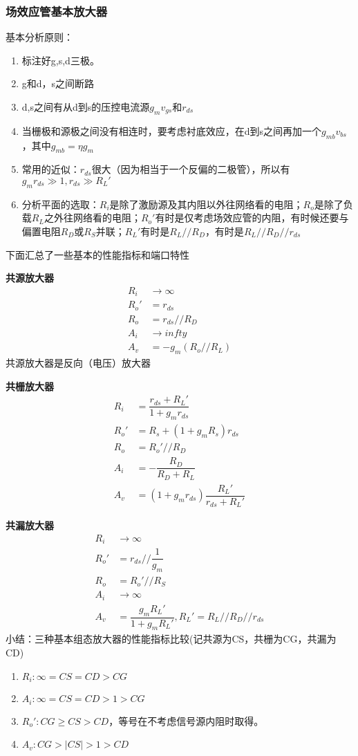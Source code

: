 \documentclass{ctexart}
\newcommand*{\noindbfline}[1]{{\noindent \bf{#1} \newline}}
\begin{document}
\subsubsection{场效应管基本放大器}
基本分析原则：
\begin{enumerate}
    \item 标注好g,s,d三极。
    \item g和d，s之间断路
    \item d,s之间有从d到s的压控电流源$g_mv_{gs}$和$r_{ds}$
    \item 当栅极和源极之间没有相连时，要考虑衬底效应，在d到s之间再加一个$g_{mb}v_{bs}$，其中$g_{mb}=\eta g_m$
    \item 常用的近似：$r_{ds}$很大（因为相当于一个反偏的二极管），所以有$g_mr_{ds} \gg 1,r_{ds}\gg R_L'$
    \item 分析平面的选取：$R_i$是除了激励源及其内阻以外往网络看的电阻；$R_o$是除了负载$R_L$之外往网络看的电阻；$R_o'$有时是仅考虑场效应管的内阻，有时候还要与偏置电阻$R_D$或$R_S$并联；$R_L'$有时是$R_L//R_D$，有时是$R_L//R_D//r_{ds}$
\end{enumerate}
下面汇总了一些基本的性能指标和端口特性

\noindbfline{共源放大器}
\begin{align}
    R_i&\rightarrow \infty\\
    R_o'&=r_{ds}\\
    R_o&=r_{ds}//R_D\\
    A_i&\rightarrow infty\\
    A_v&=-g_m(R_o//R_L)
\end{align}
共源放大器是反向（电压）放大器

\noindbfline{共栅放大器}
\begin{align}
    R_i&=\dfrac{r_{ds}+R_L'}{1+g_mr_{ds}}\\
    R_o'&=R_s+(1+g_mR_s)r_{ds}\\
    R_o&=R_o'//R_D\\
    A_i&=-\dfrac{R_D}{R_D+R_L}\\
    A_v&=(1+g_mr_{ds})\dfrac{R_L'}{r_{ds}+R_L'}
\end{align}

\noindbfline{共漏放大器}
\begin{align}
    R_i&\rightarrow \infty\\
    R_o'&=r_{ds}//\dfrac{1}{g_m}\\
    R_o&=R_o'//R_S\\
    A_i&\rightarrow \infty\\
    A_v&=\dfrac{g_mR_L'}{1+g_mR_L'},R_L'=R_L//R_D//r_{ds}
\end{align}
小结：三种基本组态放大器的性能指标比较(记共源为CS，共栅为CG，共漏为CD)
\begin{enumerate}
    \item $R_i:\infty=CS=CD>CG$
    \item $A_i:\infty=CS=CD>1>CG$
    \item $R_o':CG\geq CS >CD$，等号在不考虑信号源内阻时取得。
    \item $A_v:CG>|CS|>1>CD$
\end{enumerate}
\end{document}
